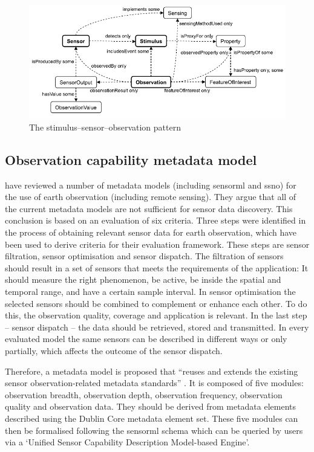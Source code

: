 \begin{figure}
	\centering
	\includegraphics[width=1\linewidth]{figs/sens_stim_obs.png}
	\caption{The stimulus–sensor–observation pattern \cite[p. 28]{SSW:SSN_incubatorGroup}}
	\label{fig:sens-stim-obs}
\end{figure}

\subsection{Observation capability metadata model} 
\cite{SW:Hu} have reviewed a number of metadata models (including \ac{sensorml} and \ac{ssno}) for the use of earth observation (including remote sensing). They argue that all of the current metadata models are not sufficient for sensor data discovery. This conclusion is based on an evaluation of six criteria. Three steps were identified in the process of obtaining relevant sensor data for earth observation, which have been used to derive criteria for their evaluation framework. These steps are sensor filtration, sensor optimisation and sensor dispatch. The filtration of sensors should result in a set of sensors that meets the requirements of the application: It should measure the right phenomenon, be active, be inside the spatial and temporal range, and have a certain sample interval. In sensor optimisation the selected sensors should be combined to complement or enhance each other. To do this, the observation quality, coverage and application is relevant. In the last step -- sensor dispatch -- the data should be retrieved, stored and transmitted. In every evaluated model the same sensors can be described in different ways or only partially, which affects the outcome of the sensor dispatch. 

Therefore, a metadata model is proposed that \enquote{reuses and extends the existing sensor observation-related metadata standards} \cite[p. 10546]{SW:Hu}. It is composed of five modules: observation breadth, observation depth, observation frequency, observation quality and observation data. They should be derived from metadata elements described using the Dublin Core metadata element set. These five modules can then be formalised following the \ac{sensorml} schema which can be queried by users via a `Unified Sensor Capability Description Model-based Engine'. 

